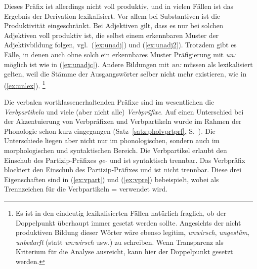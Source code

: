 Dieses Präfix ist allerdings nicht voll produktiv, und in vielen Fällen ist das Ergebnis der Derivation lexikalisiert.
Vor allem bei Substantiven ist die Produktivität eingeschränkt.
Bei Adjektiven gilt, dass es nur bei solchen Adjektiven voll produktiv ist, die selbst einem erkennbaren Muster der Adjektivbildung folgen, vgl.\ (\ref{ex:unadj}) und (\ref{ex:unadj2}).
Trotzdem gibt es Fälle, in denen auch ohne solch ein erkennbares Muster Präfigierung mit \textit{un:} möglich ist wie in (\ref{ex:unadjc}).
Andere Bildungen mit \textit{un:} müssen als lexikalisiert gelten, weil die Stämme der Ausgangswörter selber nicht mehr existieren, wie in (\ref{ex:unlex}).%
\footnote{Es ist in den eindeutig lexikalisierten Fällen natürlich fraglich, ob der Doppelpunkt überhaupt immer gesetzt werden sollte.
Angesichts der nicht produktiven Bildung dieser Wörter wäre ebenso legitim, \textit{unwirsch}, \textit{ungestüm}, \textit{unbedarft} (statt \textit{un:wirsch} usw.) zu schreiben.
Wenn Transparenz als Kriterium für die Analyse ausreicht, kann hier der Doppelpunkt gesetzt werden.}

\begin{exe}
  \ex\label{ex:unadj}
    \begin{xlist} 
  \end{xlist}
  \ex\label{ex:unadj2}
  \begin{xlist}
  \end{xlist}
  \ex\label{ex:unlex}
  \begin{xlist}
  \end{xlist}
\end{exe}


Die verbalen wortklassenerhaltenden Präfixe sind im wesentlichen die \textit{Verbpartikeln} und viele (aber nicht alle) \textit{Verbpräfixe}.
Auf einen Unterschied bei der Akzentuierung von Verbpräfixen und Verbpartikeln wurde im Rahmen der Phonologie schon kurz eingegangen (Satz~\ref{satz:pholvprtprf}, S.~\pageref{satz:pholvprtprf}).
Die Unterschiede liegen aber nicht nur im phonologischen, sondern auch im morphologischen und syntaktischen Bereich.
Die Verbpartikel erlaubt den Einschub des Partizip-Präfixes \textit{ge-} und ist syntaktisch trennbar.
Das Verbpräfix blockiert den Einschub des Partizip-Präfixes und ist nicht trennbar.
Diese drei Eigenschaften sind in (\ref{ex:vpart}) und (\ref{ex:vpre}) bebeispielt, wobei als Trennzeichen für die Verbpartikeln = verwendet wird.

